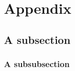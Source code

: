 \section{Appendix}
\lipsum[1-2]
\subsection{A subsection}
\lipsum[1-2]
\subsubsection{A subsubsection}
\lipsum[1-2]